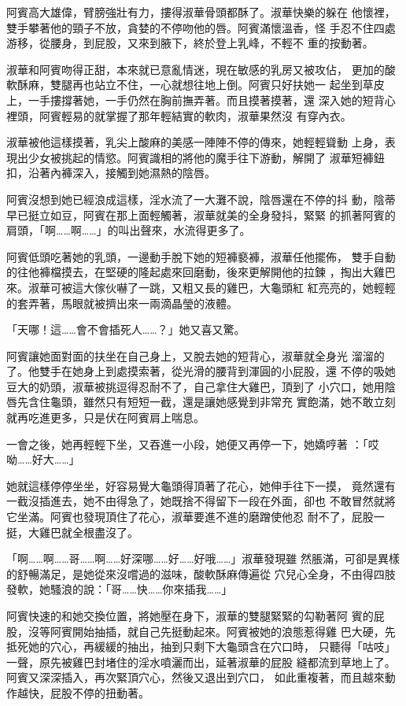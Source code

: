 阿賓高大雄偉，臂膀強壯有力，摟得淑華骨頭都酥了。淑華快樂的躲在
他懷裡，雙手攀著他的頸子不放，貪婪的不停吻他的唇。阿賓滿懷溫香，怪
手忍不住四處游移，從腰身，到屁股，又來到腋下，終於登上乳峰，不輕不
重的按動著。

淑華和阿賓吻得正甜，本來就已意亂情迷，現在敏感的乳房又被攻佔，
更加的酸軟酥麻，雙腿再也站立不住，一心就想往地上倒。阿賓只好扶她一
起坐到草皮上，一手摟撐著她，一手仍然在胸前撫弄著。而且摸著摸著，還
深入她的短背心裡頭，阿賓輕易的就掌握了那年輕結實的軟肉，淑華果然沒
有穿內衣。

淑華被他這樣摸著，乳尖上酸麻的美感一陣陣不停的傳來，她輕輕聳動
上身，表現出少女被挑起的情慾。阿賓識相的將他的魔手往下游動，解開了
淑華短褲鈕扣，沿著內褲深入，接觸到她濕熱的陰唇。

阿賓沒想到她已經浪成這樣，淫水流了一大灘不說，陰唇還在不停的抖
動，陰蒂早已挺立如豆，阿賓在那上面輕觸著，淑華就美的全身發抖，緊緊
的抓著阿賓的肩頭，「啊……啊……」的叫出聲來，水流得更多了。

阿賓低頭吃著她的乳頭，一邊動手脫下她的短褲褻褲，淑華任他擺佈，
雙手自動的往他褲檔摸去，在堅硬的隆起處來回磨動，後來更解開他的拉鍊
，掏出大雞巴來。淑華可被這大傢伙嚇了一跳，又粗又長的雞巴，大龜頭紅
紅亮亮的，她輕輕的套弄著，馬眼就被擠出來一兩滴晶瑩的液體。

「天哪！這……會不會插死人……？」她又喜又驚。

阿賓讓她面對面的扶坐在自己身上，又脫去她的短背心，淑華就全身光
溜溜的了。他雙手在她身上到處摸索著，從光滑的腰背到渾圓的小屁股，還
不停的吸她豆大的奶頭，淑華被挑逗得忍耐不了，自己拿住大雞巴，頂到了
小穴口，她用陰唇先含住龜頭，雖然只有短短一截，還是讓她感覺到非常充
實飽滿，她不敢立刻就再吃進更多，只是伏在阿賓肩上喘息。

一會之後，她再輕輕下坐，又吞進一小段，她便又再停一下，她嬌哼著
：「哎呦……好大……」

她就這樣停停坐坐，好容易覺大龜頭得頂著了花心，她伸手往下一摸，
竟然還有一截沒插進去，她不由得急了，她既捨不得留下一段在外面，卻也
不敢冒然就將它坐滿。阿賓也發現頂住了花心，淑華要進不進的磨蹭使他忍
耐不了，屁股一挺，大雞巴就全根盡沒了。

「啊……啊……哥……啊……好深哪……好……好哦……」淑華發現雖
然脹滿，可卻是異樣的舒暢滿足，是她從來沒嚐過的滋味，酸軟酥麻傳遍從
穴兒心全身，不由得四肢發軟，她騷浪的說：「哥……快……你來插我……」

阿賓快速的和她交換位置，將她壓在身下，淑華的雙腿緊緊的勾勒著阿
賓的屁股，沒等阿賓開始抽插，就自己先挺動起來。阿賓被她的浪態惹得雞
巴大硬，先抵死她的穴心，再緩緩的抽出，抽到只剩下大龜頭含在穴口時，
只聽得「咕吱」一聲，原先被雞巴封堵住的淫水噴灑而出，延著淑華的屁股
縫都流到草地上了。阿賓又深深插入，再次緊頂穴心，然後又退出到穴口，
如此重複著，而且越來動作越快，屁股不停的扭動著。

